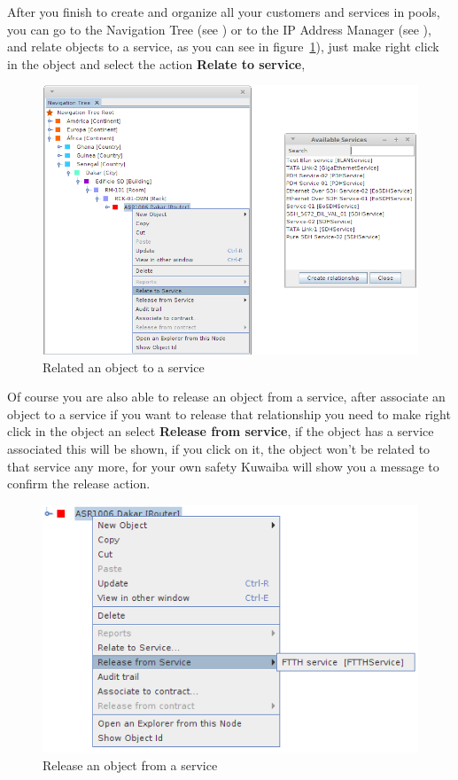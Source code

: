 \documentclass[a4paper]{article}
\begin{document}
	After you finish to create and organize all your customers and services in pools, you can go to the Navigation Tree (see \textbf{}) or to the IP Address Manager (see \textbf{}), and relate objects to a service, as you can see in figure~\ref{fig:sm_relate_to_service}), just make right click in the object and select the action \textbf{Relate to service},
	\begin{figure}[h!]
		\centering
		\includegraphics[width=0.9\linewidth]{img/sm_relate_to_service.png}
		\caption{Related an object to a service}
		\label{fig:sm_relate_to_service}
	\end{figure}
	
	\newpage
	Of course you are also able to release an object from a service, after associate an object to a service if you want to release that relationship you need to make right click in the object an select  \textbf{Release from service}, if the object has a service associated this will be shown, if you click on it, the object won't be related to that service any more, for your own safety Kuwaiba will show you a message to confirm the release action.
	
	\begin{figure}[h!]
		\centering
		\includegraphics[width=0.5\linewidth]{img/sm_release_from_service.png}
		\caption{Release an object from a service}
		\label{fig:sm_release_from_service}
	\end{figure}
	
\end{document}
